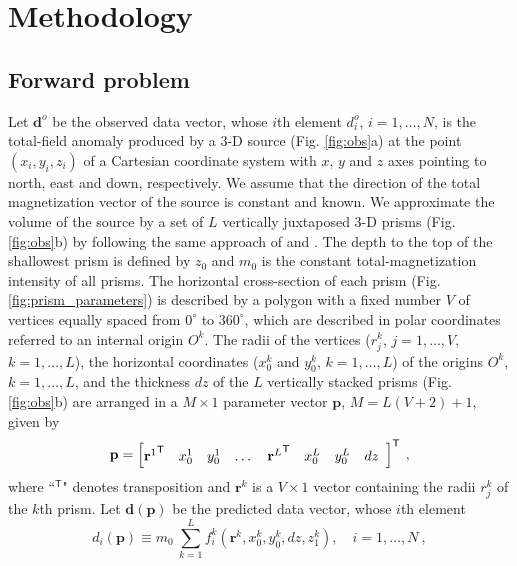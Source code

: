 \section{Methodology}\label{sec:metodo}

\subsection{Forward problem}

Let $\mathbf{d}^{o}$ be the observed data vector, whose $i$th element $d^{o}_{i}$, $i = 1, \dots, N$, is the total-field anomaly produced by a 3-D source (Fig. \ref{fig:obs}a) at the point $(x_{i}, y_{i}, z_{i})$ of a Cartesian coordinate system with $x$, $y$ and $z$ axes pointing to north, east and down, respectively. We assume that the direction of the total magnetization vector of the source is constant and known. We approximate the volume of the source by a set of $L$ vertically juxtaposed 3-D prisms (Fig. \ref{fig:obs}b) by following the same approach of \cite{oliveirajr-etal2011} and \cite{oliveirajr-barbosa2013}. The depth to the top of the shallowest prism is defined by $z_{0}$ and $m_{0}$ is the constant total-magnetization intensity of all prisms. The horizontal cross-section of each prism (Fig. \ref{fig:prism_parameters}) 
is described by a polygon with a fixed number $V$ of vertices equally spaced from $0^{\circ}$ to $360^{\circ}$, which are described in polar coordinates referred to an internal origin $O^{k}$. The radii of the vertices ($r^{k}_{j}$, $j=1,\dots , V$, $k=1,\dots ,L$), the horizontal coordinates ($x_{0}^{k}$ and $y_{0}^{k}$, $k=1,\dots ,L$) of the origins $O^{k}$, $k=1,\dots ,L$, and the thickness $dz$ of the $L$ vertically stacked prisms (Fig. \ref{fig:obs}b) are arranged in a $M \times 1$ parameter vector $\mathbf{p}$, $M = L (V + 2) + 1$, given by
\begin{equation}
\mathbf{p} = \left[ \begin{array}{@{}*{12}{c}@{}}
{\mathbf{r}^{1}}^{\mathsf{T}} & x_{0}^{1} & y_{0}^{1} & \dots & {\mathbf{r}^{L}}^{\mathsf{T}} & x_{0}^{L} & y_{0}^{L} & dz \\
\end{array} \right]^{\mathsf{T}} \: ,
\label{eq:p-vector}
\end{equation}
where ``$^{\mathsf{T}}$" denotes transposition and $\mathbf{r}^{k}$ is a $V \times 1$ vector containing the radii $r^{k}_{j}$ 
of the $k$th prism.
Let $\mathbf{d} (\mathbf{p})$ be the predicted data vector, whose $i$th element 
\begin{equation}
d_{i} (\mathbf{p}) \equiv m_{0} \: \sum\limits_{k=1}^{L} f_{i}^{k}(\mathbf{r}^{k}, x_{0}^{k}, y_{0}^{k}, dz, z_{1}^{k}), \quad i = 1, \dots, N \: ,
\label{eq:predicted-data-i}
\end{equation}
